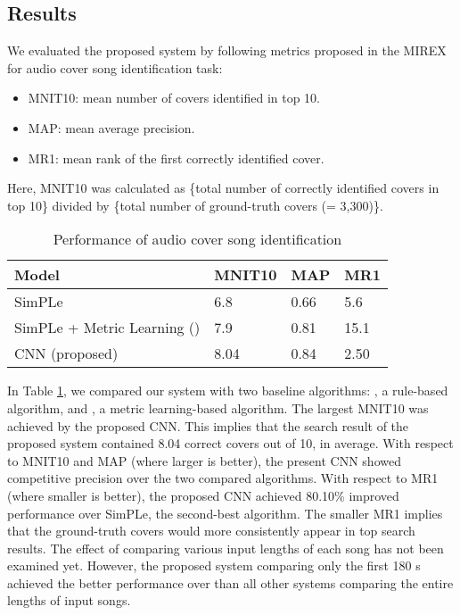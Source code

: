 \documentclass{article}
\begin{document}
\subsection{Results}
\label{subsec:results}
We evaluated the proposed system by following metrics proposed in the MIREX for audio cover song identification task: 
\begin{itemize}
\item MNIT10: mean number of covers identified in top 10. 
\item MAP: mean average precision.
\item MR1: mean rank of the first correctly identified cover.
\end{itemize}
Here, MNIT10 was calculated as \{total number of correctly identified covers in top 10\} divided by \{total number of ground-truth covers (= 3,300)\}.
\begin{table}[h]
\centering
\caption{Performance of audio cover song identification}
\label{tab:performance}
\begin{tabular}{@{}llll@{}}
\toprule
Model                  & MNIT10 & MAP  & MR1  \\ \midrule
SimPLe \citet{silva2016simple}  & 6.8    & 0.66 & 5.6 \\
SimPLe + Metric Learning (\citet{heocover}) & 7.9    & 0.81 & 15.1 \\
CNN (proposed)         & 8.04   & 0.84 & 2.50
\end{tabular}
\end{table}

In Table \ref{tab:performance}, we compared our system with two baseline algorithms: \citet{silva2016simple}, a rule-based algorithm, and \citet{heocover}, a metric learning-based algorithm. The largest MNIT10 was achieved by the proposed CNN. This implies that the search result of the proposed system contained 8.04 correct covers out of 10, in average. With respect to MNIT10 and MAP (where larger is better), the present CNN showed competitive precision over the two compared algorithms. With respect to MR1 (where smaller is better), the proposed CNN achieved 80.10\% improved performance over SimPLe, the second-best algorithm. The smaller MR1 implies that the ground-truth covers would more consistently appear in top search results. The effect of comparing various input lengths of each song has not been examined yet. However, the proposed system comparing only the first 180 s achieved the better performance over than all other systems comparing the entire lengths of input songs. 
\end{document}
